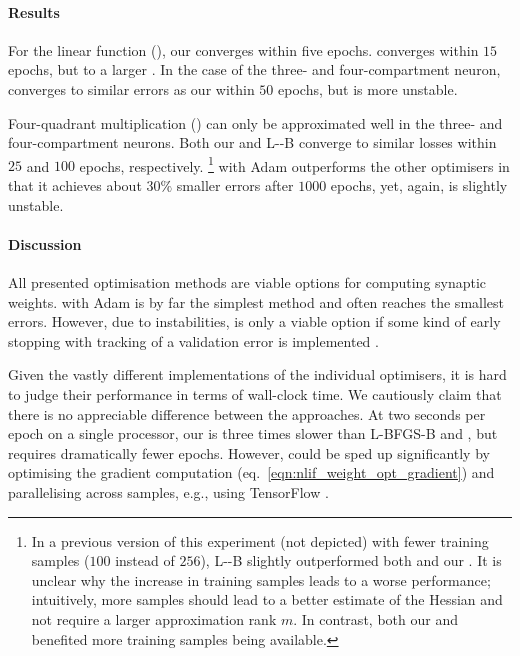 \paragraph{Results}
For the linear function (), our \SQP converges within five epochs. \BFGS converges within $15$ epochs, but to a larger \NRMSE.
In the case of the three- and four-compartment neuron, \SGD converges to similar errors as our \SQP within $50$ epochs, but is more unstable.

Four-quadrant multiplication () can only be approximated well in the three- and four-compartment neurons.
Both our \SQP and L-\BFGS-B converge to similar losses within $25$ and $100$ epochs, respectively.%
\footnote{In a previous version of this experiment (not depicted) with fewer training samples ($100$ instead of $256$), L-\BFGS-B slightly outperformed both \SGD and our \SQP.
It is unclear why the increase in training samples leads to a worse performance; intuitively, more samples should lead to a better estimate of the Hessian and not require a larger approximation rank $m$.
In contrast, both our \SQP and \SGD benefited more training samples being available.
}
\SGD with Adam outperforms the other optimisers in that it achieves about $30\%$ smaller errors after $1000$ epochs, yet, again, is slightly unstable.

\paragraph{Discussion}
All presented optimisation methods are viable options for computing synaptic weights.
\SGD with Adam is by far the simplest method and often reaches the smallest errors.
However, due to instabilities, \SGD is only a viable option if some kind of early stopping with tracking of a validation error is implemented \citep[e.g.,][Section~7.1]{goodfellow2016deep}.

Given the vastly different implementations of the individual optimisers, it is hard to judge their performance in terms of wall-clock time.
We cautiously claim that there is no appreciable difference between the approaches.
At two seconds per epoch on a single processor, our \SQP is three times slower than L-BFGS-B and \SGD, but requires dramatically fewer epochs.
However, \SGD could be sped up significantly by optimising the gradient computation (eq.~\ref{eqn:nlif_weight_opt_gradient}) and parallelising across samples, e.g., using TensorFlow \citep{abadi2016tensorflow}.

